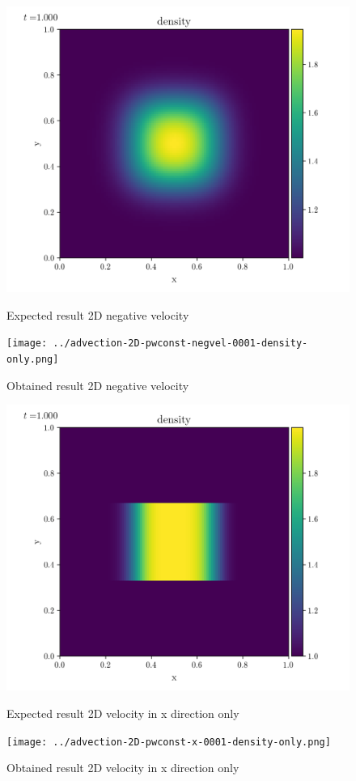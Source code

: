 \begin{figure}[htbp]
    \centering
	\includegraphics[width=.7\textwidth]{./figures/advection-2D-pwconst-negvel-0001-density-only.png}%
	\caption{Expected result 2D negative velocity}
	\texttt{[image: ../advection-2D-pwconst-negvel-0001-density-only.png]}%
	\caption{Obtained result 2D negative velocity}
\end{figure}

\begin{figure}[htbp]
    \centering
	\includegraphics[width=.7\textwidth]{./figures/advection-2D-pwconst-x-0001-density-only.png}%
	\caption{Expected result 2D velocity in x direction only}
	\texttt{[image: ../advection-2D-pwconst-x-0001-density-only.png]}%
	\caption{Obtained result 2D velocity in x direction only}
\end{figure}

